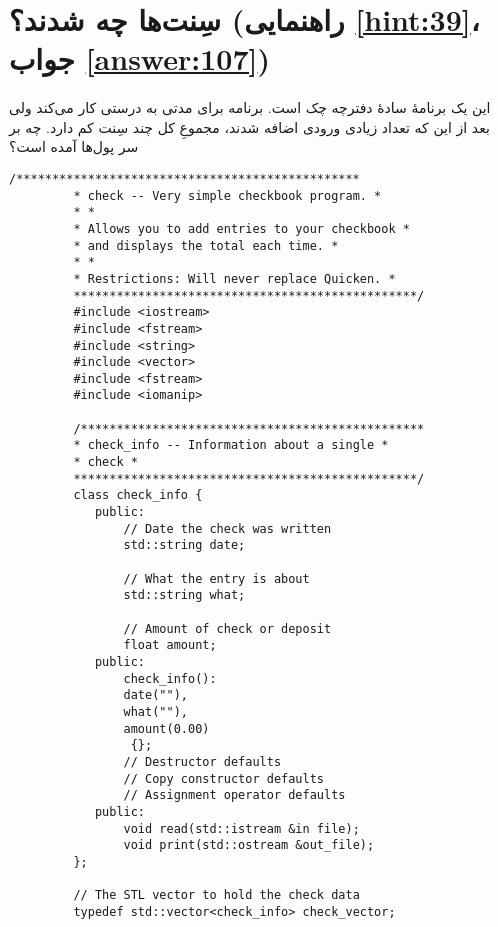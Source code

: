 \section[سِنت‌ها چه شدند؟]{سِنت‌ها چه شدند؟ \protect{} (راهنمایی \ref{hint:39}، جواب \ref{answer:107})}
\paragraph{}\label{prog:34}
این یک برنامهٔ سادهٔ دفترچه چک است. برنامه برای مدتی به درستی کار می‌کند ولی بعد از این که تعداد زیادی ورودی اضافه شدند، مجموعِ کل چند سِنت کم دارد. چه بر سر پول‌ها آمده است؟

\begin{LTR}
    \begin{lstlisting}[style=C++Style]
         /************************************************
         * check -- Very simple checkbook program. *
         * *
         * Allows you to add entries to your checkbook *
         * and displays the total each time. *
         * *
         * Restrictions: Will never replace Quicken. *
         ************************************************/
         #include <iostream>
         #include <fstream>
         #include <string>
         #include <vector>
         #include <fstream>
         #include <iomanip>

         /************************************************
         * check_info -- Information about a single *
         * check *
         ************************************************/
         class check_info {
         	public:
         		// Date the check was written
        	 	std::string date;

         		// What the entry is about
         		std::string what;

         		// Amount of check or deposit
         		float amount;
         	public:
         		check_info():
         		date(""),
         		what(""),
         		amount(0.00)
        		 {};
         		// Destructor defaults
         		// Copy constructor defaults
         		// Assignment operator defaults
         	public:
         		void read(std::istream &in file);
         		void print(std::ostream &out_file);
         };

         // The STL vector to hold the check data
         typedef std::vector<check_info> check_vector;


\end{lstlisting}
\end{LTR}
